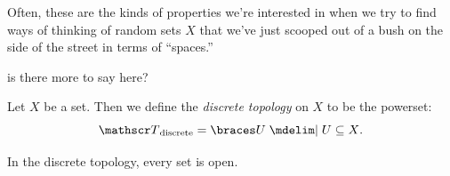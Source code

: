 \documentclass{fkpaper}
\begin{document}
\begin{multicols}{2}
  Often, these are the kinds of properties we're interested in when we
  try to find ways of thinking of random sets $X$ that we've just
  scooped out of a bush on the side of the street in terms of
  ``spaces.''

  {\color{blue} is there more to say here?}

  \begin{definition}
    Let $X$ be a set. Then we define the \emph{discrete topology} on
    $X$ to be the powerset:
    \[
      \ms T_{\rm discrete} = \set{U \MID U \subseteq X}.
    \]
  \end{definition}
  In the discrete topology, every set is open.
\end{multicols}
\end{document}
